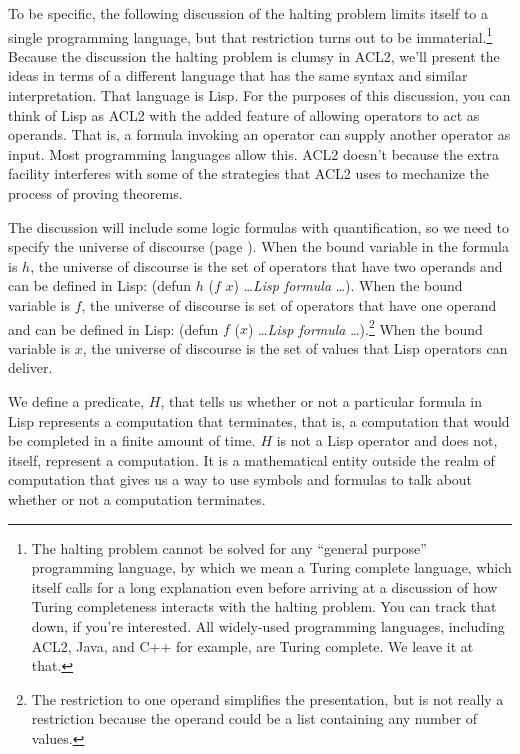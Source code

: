 To be specific, the following discussion of the halting problem
limits itself to a single programming language, but
that restriction turns out to be immaterial.\footnote{The
halting problem cannot be solved
for any ``general purpose'' programming language,
by which we mean a Turing complete language,
which itself calls for a long explanation even
before arriving at a discussion of how Turing completeness
interacts with the halting problem.
You can track that down, if you're interested.
All widely-used programming languages,
including ACL2, Java, and C++ for example, are Turing complete.
We leave it at that.}
Because the discussion the halting problem is clumsy in ACL2,
we'll present the ideas in terms of a different
language that has the same syntax
and similar interpretation. That language is Lisp.
For the purposes of this discussion,
you can think of Lisp as ACL2 with the added feature
of allowing operators to act as operands.
That is, a formula invoking an operator can supply
another operator as input.
Most programming languages allow this.
ACL2 doesn't because the extra facility
interferes with some of the strategies that ACL2 uses
to mechanize the process of proving theorems.

The discussion will include some logic formulas with
quantification,
so we need to specify the universe of discourse
(page \pageref{def-universe-of-discourse}).
When the bound variable
in the formula is $h$, the universe of discourse
is the set of operators that have
two operands and can be defined in Lisp:
(defun $h$ ($f$ $x$) \dots \emph{Lisp formula} \dots ).
When the bound variable is $f$,
the universe of discourse is  set of operators
that have one operand and can be defined in Lisp:
(defun $f$ ($x$) \dots \emph{Lisp formula} \dots ).\footnote{The
restriction to one operand simplifies the presentation,
but is not really a restriction because the operand could
be a list containing any number of values.}
When the bound variable is $x$, the universe of discourse
is the set of values that Lisp operators can deliver.

We define a predicate, $H$, that tells us whether or not
a particular formula in Lisp represents a computation that terminates,
that is, a computation that would be completed in a finite amount of time.
$H$ is not a Lisp operator and does not, itself,
represent a computation. It is a mathematical entity
outside the realm of computation that gives us a way
to use symbols and formulas to talk about
whether or not a computation terminates.

